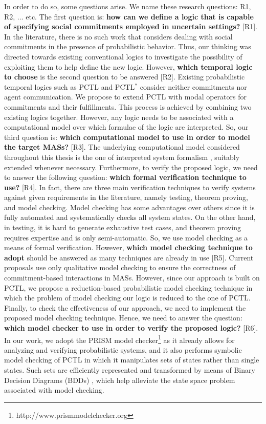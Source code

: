 In order to do so, some questions arise. We name these research questions: R1, R2, $\dots$ etc. The first question is: \textbf{how can we define a logic that is capable of specifying social commitments employed in uncertain settings?} [R1]. In the literature, there is no such work that considers dealing with social commitments in the presence of probabilistic behavior. Thus, our thinking was directed towards existing conventional logics to investigate the possibility of exploiting them to help define the new logic.
However, \textbf{which temporal logic to choose} is the second
question to be answered [R2]. Existing probabilistic temporal logics
such as PCTL \cite{Hansson1994} and PCTL$^*$ \cite{Baier1998}
consider neither commitments nor agent communication. We
propose to extend PCTL with modal operators for commitments and
their fulfillments. This process is achieved by combining two existing logics together. However, any logic needs to be associated with
a computational model over which formulae of the logic are interpreted. So, our third question is: \textbf{which computational model to use in order to model the target MASs?} [R3]. The underlying computational model considered throughout this thesis is the one of interpreted system formalism \cite{Fagin1995}, suitably extended whenever necessary.
Furthermore, to verify the proposed logic, we need
to answer the following question: \textbf{which formal
verification technique to use?} [R4]. In fact, there are three main
verification techniques to verify systems against given
requirements in the literature, namely testing, theorem proving,
and model checking. Model checking has some advantages over
others since it is fully automated and systematically checks all system states. On the other hand, in testing, it is hard to generate
exhaustive test cases, and theorem proving requires expertise and is only semi-automatic. So, we use model checking as a means of formal verification. However, \textbf{which model checking technique to adopt} should be answered as many techniques are already in use [R5]. Current proposals use only qualitative model checking  to ensure the correctness of commitment-based interactions in MASs. However, since our approach is built on PCTL, we propose a reduction-based probabilistic model checking technique in which the problem of model checking our logic is reduced to the one of PCTL. Finally, to check the effectiveness of our approach, we need to implement the proposed model checking technique. Hence, we need to answer the question: \textbf{which model checker to use in order to verify the proposed logic?} [R6]. In our work, we adopt the PRISM model checker\footnote{http://www.prismmodelchecker.org} as it already allows for analyzing and verifying probabilistic systems, and it also performs symbolic model checking of PCTL in which it manipulates sets of states rather than single states. Such sets are efficiently represented and transformed by means of Binary Decision Diagrams (BDDs) \cite{McMillan1992}, which help alleviate the state space problem associated with model checking. 

